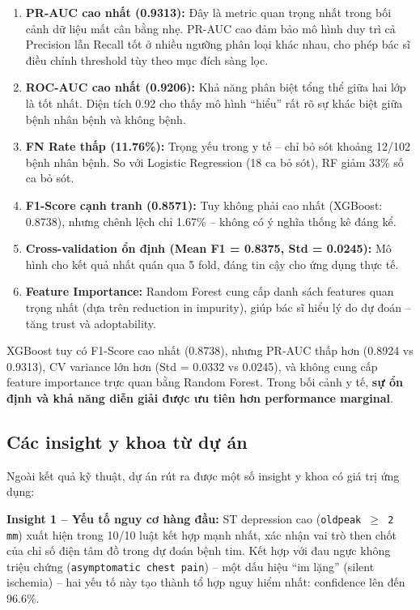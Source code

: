 \begin{enumerate}
    \item \textbf{PR-AUC cao nhất (0.9313):} Đây là metric quan trọng nhất trong bối cảnh dữ liệu mất cân bằng nhẹ. PR-AUC cao đảm bảo mô hình duy trì cả Precision lẫn Recall tốt ở nhiều ngưỡng phân loại khác nhau, cho phép bác sĩ điều chỉnh threshold tùy theo mục đích sàng lọc.
    \item \textbf{ROC-AUC cao nhất (0.9206):} Khả năng phân biệt tổng thể giữa hai lớp là tốt nhất. Diện tích 0.92 cho thấy mô hình ``hiểu'' rất rõ sự khác biệt giữa bệnh nhân bệnh và không bệnh.
    \item \textbf{FN Rate thấp (11.76\%):} Trọng yếu trong y tế -- chỉ bỏ sót khoảng 12/102 bệnh nhân bệnh. So với Logistic Regression (18 ca bỏ sót), RF giảm 33\% số ca bỏ sót.
    \item \textbf{F1-Score cạnh tranh (0.8571):} Tuy không phải cao nhất (XGBoost: 0.8738), nhưng chênh lệch chỉ 1.67\% -- không có ý nghĩa thống kê đáng kể.
    \item \textbf{Cross-validation ổn định (Mean F1 = 0.8375, Std = 0.0245):} Mô hình cho kết quả nhất quán qua 5 fold, đáng tin cậy cho ứng dụng thực tế.
    \item \textbf{Feature Importance:} Random Forest cung cấp danh sách features quan trọng nhất (dựa trên reduction in impurity), giúp bác sĩ hiểu lý do dự đoán -- tăng trust và adoptability.
\end{enumerate}

XGBoost tuy có F1-Score cao nhất (0.8738), nhưng PR-AUC thấp hơn (0.8924 vs 0.9313), CV variance lớn hơn (Std = 0.0332 vs 0.0245), và không cung cấp feature importance trực quan bằng Random Forest. Trong bối cảnh y tế, \textbf{sự ổn định và khả năng diễn giải được ưu tiên hơn performance marginal}.

\subsection{Các insight y khoa từ dự án}

Ngoài kết quả kỹ thuật, dự án rút ra được một số insight y khoa có giá trị ứng dụng:

\textbf{Insight 1 -- Yếu tố nguy cơ hàng đầu:} ST depression cao (\texttt{oldpeak $\geq$ 2 mm}) xuất hiện trong 10/10 luật kết hợp mạnh nhất, xác nhận vai trò then chốt của chỉ số điện tâm đồ trong dự đoán bệnh tim. Kết hợp với đau ngực không triệu chứng (\texttt{asymptomatic chest pain}) -- một dấu hiệu ``im lặng'' (silent ischemia) -- hai yếu tố này tạo thành tổ hợp nguy hiểm nhất: confidence lên đến 96.6\%.

